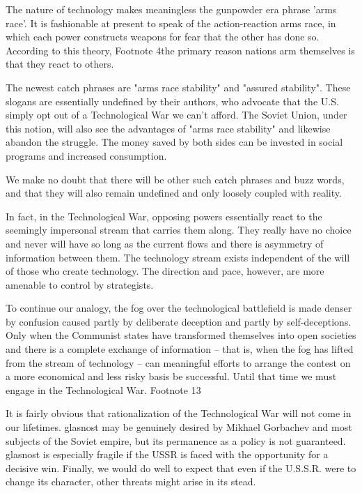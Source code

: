\documentclass[a4paper,12pt]{book}
\begin{document}
The nature of technology makes meaningless the gunpowder era phrase 'arms race'. It is fashionable at present to speak of the action-reaction arms race, in which each power constructs weapons for fear that the other has done so. According to this theory, Footnote 4the primary reason nations arm themselves is that they react to others.

The newest catch phrases are "arms race stability" and "assured stability". These slogans are essentially undefined by their authors, who advocate that the U.S. simply opt out of a Technological War we can't afford. The Soviet Union, under this notion, will also see the advantages of "arms race stability" and likewise abandon the struggle. The money saved by both sides can be invested in social programs and increased consumption.

We make no doubt that there will be other such catch phrases and buzz words, and that they will also remain undefined and only loosely coupled with reality.

In fact, in the Technological War, opposing powers essentially react to the seemingly impersonal stream that carries them along. They really have no choice and never will have so long as the current flows and there is asymmetry of information between them. The technology stream exists independent of the will of those who create technology. The direction and pace, however, are more amenable to control by strategists.

To continue our analogy, the fog over the technological battlefield is made denser by confusion caused partly by deliberate deception and partly by self-deceptions. Only when the Communist states have transformed themselves into open societies and there is a complete exchange of information -- that is, when the fog has lifted from the stream of technology -- can meaningful efforts to arrange the contest on a more economical and less risky basis be successful. Until that time we must engage in the Technological War. Footnote 13

It is fairly obvious that rationalization of the Technological War will not come in our lifetimes. glasnost may be genuinely desired by Mikhael Gorbachev and most subjects of the Soviet empire, but its permanence as a policy is not guaranteed. glasnost is especially fragile if the USSR is faced with the opportunity for a decisive win. Finally, we would do well to expect that even if the U.S.S.R. were to change its character, other threats might arise in its stead.
\end{document}
